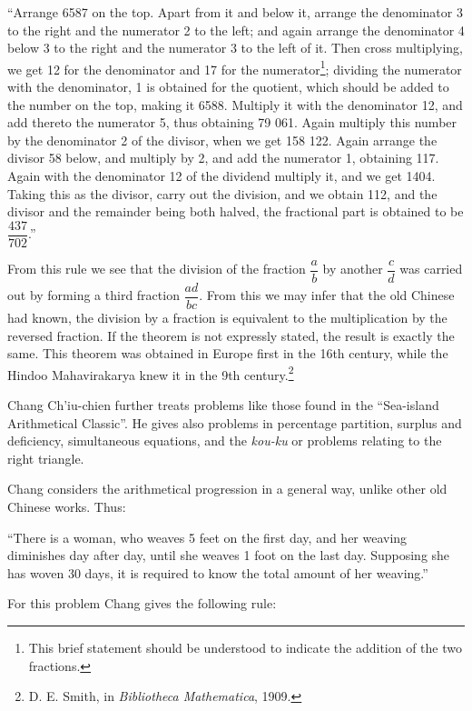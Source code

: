 \documentclass[11pt]{article}
\newcommand{\scanpage}[2]{\clearpage\setcounter{footnote}{0}\noindent{\footnotesize\color{gray}PDF page #1 · #2}\par\medskip}
\newcommand{\scanfooter}{}
\begin{document}
``Arrange 6587 on the top. Apart from it and below it, arrange the denominator 3 to the right and the numerator 2 to the left; and again arrange the denominator 4 below 3 to the right and the numerator 3 to the left of it. Then cross multiplying, we get 12 for the denominator and 17 for the numerator\footnote{This brief statement should be understood to indicate the addition of the two fractions.}; dividing the numerator with the denominator, 1 is obtained for the quotient, which should be added to the number on the top, making it 6588. Multiply it with the denominator 12, and add thereto the numerator 5, thus obtaining 79 061. Again multiply this number by the denominator 2 of the divisor, when we get 158 122. Again arrange the divisor 58 below, and multiply by 2, and add the numerator 1, obtaining 117. Again with the denominator 12 of the dividend multiply it, and we get 1404. Taking this as the divisor, carry out the division, and we obtain 112, and the divisor and the remainder being both halved, the fractional part is obtained to be $\dfrac{437}{702}$.''

From this rule we see that the division of the fraction $\dfrac{a}{b}$ by another $\dfrac{c}{d}$ was carried out by forming a third fraction $\dfrac{ad}{bc}$. From this we may infer that the old Chinese had known, the division by a fraction is equivalent to the multiplication by the reversed fraction. If the theorem is not expressly stated, the result is exactly the same. This theorem was obtained in Europe first in the 16th century, while the Hindoo Mahavirakarya knew it in the 9th century.\footnote{D. E. Smith, in \emph{Bibliotheca Mathematica}, 1909.}

Chang Ch'iu-chien further treats problems like those found in the ``Sea-island Arithmetical Classic''. He gives also problems in percentage partition, surplus and deficiency, simultaneous equations, and the \emph{kou-ku} or problems relating to the right triangle.

Chang considers the arithmetical progression in a general way, unlike other old Chinese works. Thus:
\scanfooter

\scanpage{0055}{Chapter 6, printed page 41}

``There is a woman, who weaves 5 feet on the first day, and her weaving diminishes day after day, until she weaves 1 foot on the last day. Supposing she has woven 30 days, it is required to know the total amount of her weaving.''

For this problem Chang gives the following rule:
\end{document}
